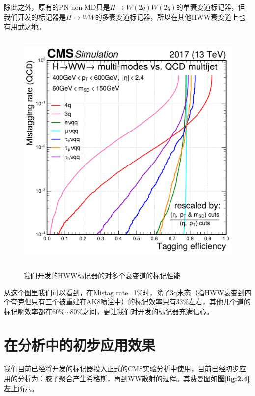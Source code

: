 除此之外，原有的PN non-MD只是$H\to W(2q)W(2q)$的单衰变道标记器，但我们开发的标记器是$H\to WW$的多衰变道标记器，所以在其他HWW衰变道上也有用武之地。
\begin{figure}[H]
 \centering
 \caption{我们开发的HWW标记器的对多个衰变道的标记性能}
 \includegraphics[height=12cm, width=12cm]{pictures/ROC_multi-modes_PKU_std.pdf}
 \label{fig:5.5}
\end{figure}
从这个图里我们可以看到，在Mistag rate=1\%时，除了3q末态（指HWW衰变到四个夸克但只有三个被重建在AK8喷注中）的标记效率只有33\%左右，其他几个道的标记啊效率都在60\%$\sim$80\%之间，更让我们对开发的标记器充满信心。
\section{在分析中的初步应用效果}
我们目前已经将开发的标记器投入正式的CMS实验分析中使用，目前已经初步应用的分析为：胶子聚合产生希格斯，再到WW散射的过程。其费曼图如\textbf{图\ref{fig:2.4}左上}所示。

